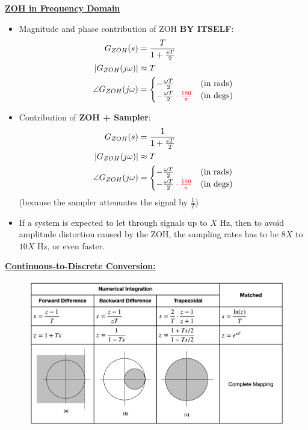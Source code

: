 \textbf{\large \underline{ZOH in Frequency Domain}}
\begin{itemize}
    \item Magnitude and phase contribution of ZOH \textbf{BY ITSELF}:
    \begin{align*}
        G_{ZOH} (s) &= \frac{T}{1+\frac{sT}{2}} \\
        |G_{ZOH}(j\omega)| &\approx T \\
        \angle G_{ZOH}(j\omega) &= \begin{cases}
            -\frac{\omega T}{2} & \text{(in rads)} \\
            -\frac{\omega T}{2} \color{red} \cdot \frac{180}{\pi} \color{black} & \text{(in degs)}
        \end{cases}
    \end{align*}
    \item Contribution of \textbf{ZOH + Sampler}:
    \begin{align*}
        G_{ZOH} (s) &= \frac{1}{1+\frac{sT}{2}} \\
        |G_{ZOH}(j\omega)| &\approx T \\
        \angle G_{ZOH}(j\omega) &= \begin{cases}
            -\frac{\omega T}{2} & \text{(in rads)} \\
            -\frac{\omega T}{2} \color{red} \cdot \frac{180}{\pi} \color{black} & \text{(in degs)}
        \end{cases}
    \end{align*}
    (because the sampler attenuates the signal by $\frac{1}{T}$)
    \item If a system is expected to let through signals up to $X$ Hz, then to avoid amplitude distortion caused by the ZOH, the sampling rates has to be $8X$ to $10X$ Hz, or even faster.
\end{itemize}


\textbf{\large \underline{Continuous-to-Discrete Conversion:}}
\begin{figure}[H]
    \centering
    \includegraphics[width=1.0\linewidth]{images/z_s_mapping_table.png}
\end{figure}

